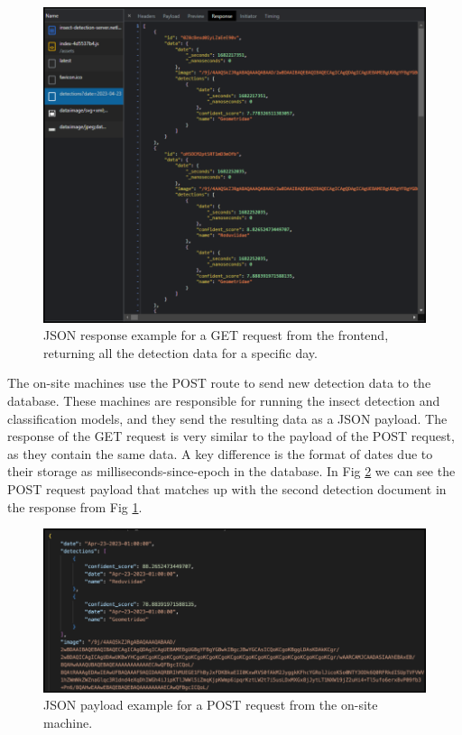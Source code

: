 \begin{figure}[H]
\begin{center}
\includegraphics[width=1.0\linewidth]{Honors_Thesis/Figures/4.3.png}
\end{center}
\caption{JSON response example for a GET request from the frontend, returning all the detection data for a specific day.}
\label{fig:4.3}
\end{figure}

The on-site machines use the POST route to send new detection data to the database. These machines are responsible for running the insect detection and classification models, and they send the resulting data as a JSON payload. The response of the GET request is very similar to the payload of the POST request, as they contain the same data. A key difference is the format of dates due to their storage as milliseconds-since-epoch in the database. In Fig \ref{fig:4.4} we can see the POST request payload that matches up with the second detection document in the response from Fig \ref{fig:4.3}.

\begin{figure}[H]
\begin{center}
\includegraphics[width=1.0\linewidth]{Honors_Thesis/Figures/4.4.png}
\end{center}
\caption{JSON payload example for a POST request from the on-site machine. }
\label{fig:4.4}
\end{figure}

